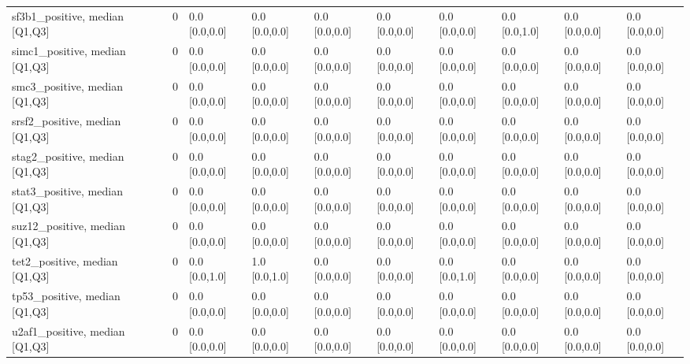 \begin{tabular}{lllllllllll}
sf3b1\_positive, median [Q1,Q3] &    &                    0 &       0.0 [0.0,0.0] &      0.0 [0.0,0.0] &        0.0 [0.0,0.0] &       0.0 [0.0,0.0] &     0.0 [0.0,0.0] &     0.0 [0.0,1.0] &       0.0 [0.0,0.0] &        0.0 [0.0,0.0] \\
simc1\_positive, median [Q1,Q3] &    &                    0 &       0.0 [0.0,0.0] &      0.0 [0.0,0.0] &        0.0 [0.0,0.0] &       0.0 [0.0,0.0] &     0.0 [0.0,0.0] &     0.0 [0.0,0.0] &       0.0 [0.0,0.0] &        0.0 [0.0,0.0] \\
smc3\_positive, median [Q1,Q3] &    &                    0 &       0.0 [0.0,0.0] &      0.0 [0.0,0.0] &        0.0 [0.0,0.0] &       0.0 [0.0,0.0] &     0.0 [0.0,0.0] &     0.0 [0.0,0.0] &       0.0 [0.0,0.0] &        0.0 [0.0,0.0] \\
srsf2\_positive, median [Q1,Q3] &    &                    0 &       0.0 [0.0,0.0] &      0.0 [0.0,0.0] &        0.0 [0.0,0.0] &       0.0 [0.0,0.0] &     0.0 [0.0,0.0] &     0.0 [0.0,0.0] &       0.0 [0.0,0.0] &        0.0 [0.0,0.0] \\
stag2\_positive, median [Q1,Q3] &    &                    0 &       0.0 [0.0,0.0] &      0.0 [0.0,0.0] &        0.0 [0.0,0.0] &       0.0 [0.0,0.0] &     0.0 [0.0,0.0] &     0.0 [0.0,0.0] &       0.0 [0.0,0.0] &        0.0 [0.0,0.0] \\
stat3\_positive, median [Q1,Q3] &    &                    0 &       0.0 [0.0,0.0] &      0.0 [0.0,0.0] &        0.0 [0.0,0.0] &       0.0 [0.0,0.0] &     0.0 [0.0,0.0] &     0.0 [0.0,0.0] &       0.0 [0.0,0.0] &        0.0 [0.0,0.0] \\
suz12\_positive, median [Q1,Q3] &    &                    0 &       0.0 [0.0,0.0] &      0.0 [0.0,0.0] &        0.0 [0.0,0.0] &       0.0 [0.0,0.0] &     0.0 [0.0,0.0] &     0.0 [0.0,0.0] &       0.0 [0.0,0.0] &        0.0 [0.0,0.0] \\
tet2\_positive, median [Q1,Q3] &    &                    0 &       0.0 [0.0,1.0] &      1.0 [0.0,1.0] &        0.0 [0.0,0.0] &       0.0 [0.0,0.0] &     0.0 [0.0,1.0] &     0.0 [0.0,0.0] &       0.0 [0.0,0.0] &        0.0 [0.0,0.0] \\
tp53\_positive, median [Q1,Q3] &    &                    0 &       0.0 [0.0,0.0] &      0.0 [0.0,0.0] &        0.0 [0.0,0.0] &       0.0 [0.0,0.0] &     0.0 [0.0,0.0] &     0.0 [0.0,0.0] &       0.0 [0.0,0.0] &        0.0 [0.0,0.0] \\
u2af1\_positive, median [Q1,Q3] &    &                    0 &       0.0 [0.0,0.0] &      0.0 [0.0,0.0] &        0.0 [0.0,0.0] &       0.0 [0.0,0.0] &     0.0 [0.0,0.0] &     0.0 [0.0,0.0] &       0.0 [0.0,0.0] &        0.0 [0.0,0.0] \\

\end{tabular}
